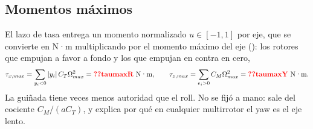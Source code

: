 \subsection{Momentos máximos}

El lazo de tasa entrega un momento normalizado $u\in[-1,1]$ por eje, que se
convierte en N·m multiplicando por el momento máximo del eje
(): los rotores que empujan a favor a fondo y
los que empujan en contra en cero,
\begin{equation}
\tau_{x,max}=\sum_{y_i<0}|y_i|\,C_T\Omega_{max}^2=\val{taumaxR}~\text{N·m},\qquad
\tau_{z,max}=\sum_{e_i>0}C_M\Omega_{max}^2=\val{taumaxY}~\text{N·m}.
\label{eq:taumax}
\end{equation}
La guiñada tiene  veces menos autoridad que el roll. No se fijó a
mano: sale del cociente $C_M/(aC_T)$, y explica por qué en cualquier
multirrotor el yaw es el eje lento.
